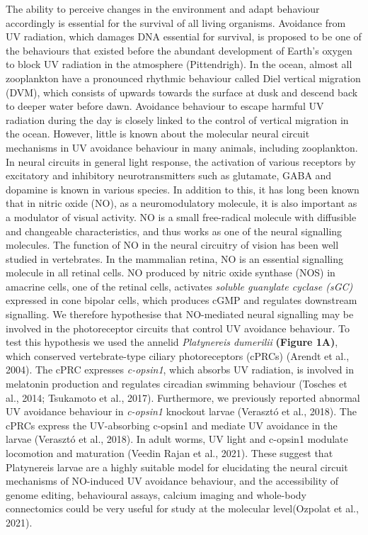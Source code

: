 \documentclass[
  10pt,
  onecolumn]{article}
\begin{document}
The ability to perceive changes in the environment and adapt behaviour
accordingly is essential for the survival of all living organisms.
Avoidance from UV radiation, which damages DNA essential for survival,
is proposed to be one of the behaviours that existed before the abundant
development of Earth's oxygen to block UV radiation in the atmosphere
(Pittendrigh). In the ocean, almost all zooplankton have a pronounced
rhythmic behaviour called Diel vertical migration (DVM), which consists
of upwards towards the surface at dusk and descend back to deeper water
before dawn. Avoidance behaviour to escape harmful UV radiation during
the day is closely linked to the control of vertical migration in the
ocean. However, little is known about the molecular neural circuit
mechanisms in UV avoidance behaviour in many animals, including
zooplankton. In neural circuits in general light response, the
activation of various receptors by excitatory and inhibitory
neurotransmitters such as glutamate, GABA and dopamine is known in
various species. In addition to this, it has long been known that in
nitric oxide (NO), as a neuromodulatory molecule, it is also important
as a modulator of visual activity. NO is a small free-radical molecule
with diffusible and changeable characteristics, and thus works as one of
the neural signalling molecules. The function of NO in the neural
circuitry of vision has been well studied in vertebrates. In the
mammalian retina, NO is an essential signalling molecule in all retinal
cells. NO produced by nitric oxide synthase (NOS) in amacrine cells, one
of the retinal cells, activates \emph{soluble guanylate cyclase (sGC)}
expressed in cone bipolar cells, which produces cGMP and regulates
downstream signalling. We therefore hypothesise that NO-mediated neural
signalling may be involved in the photoreceptor circuits that control UV
avoidance behaviour. To test this hypothesis we used the annelid
\emph{Platynereis dumerilii} \textbf{(Figure 1A)}, which conserved
vertebrate-type ciliary photoreceptors (cPRCs) (Arendt et al., 2004).
The cPRC expresses \emph{c-opsin1}, which absorbs UV radiation, is
involved in melatonin production and regulates circadian swimming
behaviour (Tosches et al., 2014; Tsukamoto et al., 2017). Furthermore,
we previously reported abnormal UV avoidance behaviour in
\emph{c-opsin1} knockout larvae (Verasztó et al., 2018). The cPRCs
express the UV-absorbing c-opsin1 and mediate UV avoidance in the larvae
(Verasztó et al., 2018). In adult worms, UV light and c-opsin1 modulate
locomotion and maturation (Veedin Rajan et al., 2021). These suggest
that Platynereis larvae are a highly suitable model for elucidating the
neural circuit mechanisms of NO-induced UV avoidance behaviour, and the
accessibility of genome editing, behavioural assays, calcium imaging and
whole-body connectomics could be very useful for study at the molecular
level(Ozpolat et al., 2021).
\end{document}
